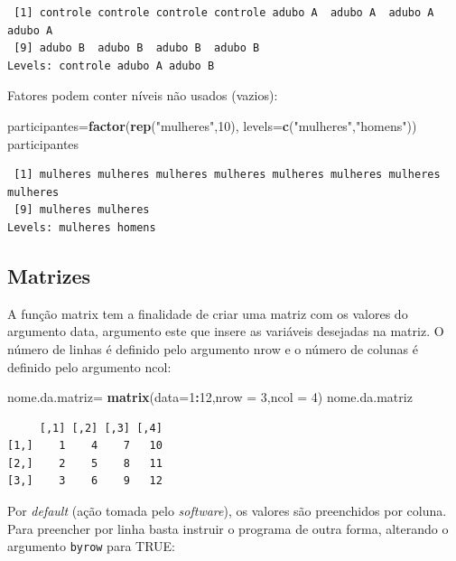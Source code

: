 \documentclass[12pt,brazil,oneside]{book}
\newenvironment{Shaded}{\begin{snugshade}}{\end{snugshade}}
\newcommand{\DataTypeTok}[1]{\textcolor[rgb]{0.13,0.29,0.53}{#1}}
\newcommand{\DecValTok}[1]{\textcolor[rgb]{0.00,0.00,0.81}{#1}}
\newcommand{\KeywordTok}[1]{\textcolor[rgb]{0.13,0.29,0.53}{\textbf{#1}}}
\newcommand{\NormalTok}[1]{#1}
\newcommand{\OperatorTok}[1]{\textcolor[rgb]{0.81,0.36,0.00}{\textbf{#1}}}
\newcommand{\StringTok}[1]{\textcolor[rgb]{0.31,0.60,0.02}{#1}}
\begin{document}
\begin{verbatim}
 [1] controle controle controle controle adubo A  adubo A  adubo A  adubo A 
 [9] adubo B  adubo B  adubo B  adubo B 
Levels: controle adubo A adubo B
\end{verbatim}

Fatores podem conter níveis não usados (vazios):

\begin{Shaded}
\begin{Highlighting}[]
\NormalTok{participantes=}\KeywordTok{factor}\NormalTok{(}\KeywordTok{rep}\NormalTok{(}\StringTok{"mulheres"}\NormalTok{,}\DecValTok{10}\NormalTok{), }\DataTypeTok{levels=}\KeywordTok{c}\NormalTok{(}\StringTok{"mulheres"}\NormalTok{,}\StringTok{"homens"}\NormalTok{))}
\NormalTok{participantes}
\end{Highlighting}
\end{Shaded}

\begin{verbatim}
 [1] mulheres mulheres mulheres mulheres mulheres mulheres mulheres mulheres
 [9] mulheres mulheres
Levels: mulheres homens
\end{verbatim}

\hypertarget{matrizes}{%
\subsection{Matrizes}\label{matrizes}}

A função matrix tem a finalidade de criar uma matriz com os valores do argumento data, argumento este que insere as variáveis desejadas na matriz. O número de linhas é definido pelo argumento nrow e o número de colunas é definido pelo argumento ncol:

\begin{Shaded}
\begin{Highlighting}[]
\NormalTok{nome.da.matriz=}\StringTok{ }\KeywordTok{matrix}\NormalTok{(}\DataTypeTok{data=}\DecValTok{1}\OperatorTok{:}\DecValTok{12}\NormalTok{,}\DataTypeTok{nrow =} \DecValTok{3}\NormalTok{,}\DataTypeTok{ncol =} \DecValTok{4}\NormalTok{)}
\NormalTok{nome.da.matriz}
\end{Highlighting}
\end{Shaded}

\begin{verbatim}
     [,1] [,2] [,3] [,4]
[1,]    1    4    7   10
[2,]    2    5    8   11
[3,]    3    6    9   12
\end{verbatim}

Por \emph{default} (ação tomada pelo \emph{software}), os valores são preenchidos por coluna. Para preencher por linha basta instruir o programa de outra forma, alterando o argumento \texttt{byrow} para TRUE:
\end{document}

